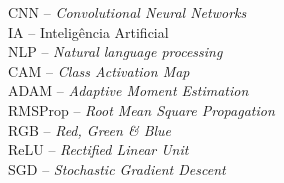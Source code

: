 \noindent \doublespacing
CNN -- \textit{Convolutional Neural Networks}\\
IA -- Inteligência Artificial \\
NLP -- \textit{Natural language processing} \\
CAM -- \textit{Class Activation Map} \\
ADAM -- \textit{Adaptive Moment Estimation} \\
RMSProp -- \textit{Root Mean Square Propagation} \\
RGB -- \textit{Red, Green \& Blue} \\
ReLU -- \textit{Rectified Linear Unit} \\
SGD -- \textit{Stochastic Gradient Descent}
